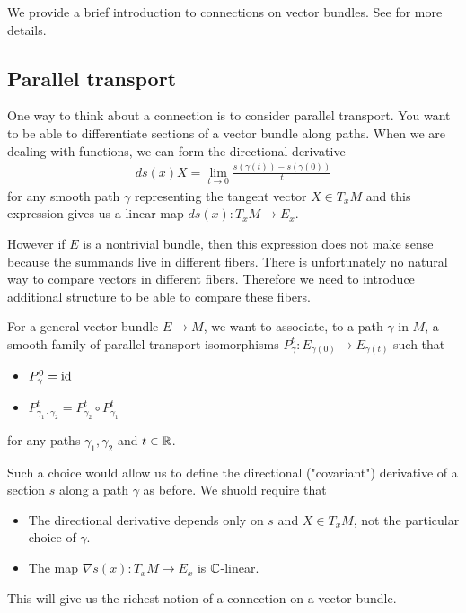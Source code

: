 We provide a brief introduction to connections on vector bundles. See \cite{huybrechts} for more details.
\subsection{Parallel transport}
One way to think about a connection is to consider parallel transport. You want to 
be able to differentiate sections of a vector bundle along paths. When we are dealing with functions,
we can form the directional derivative  \begin{align*}
    ds(x)X = \lim_{t\to 0}\frac{s(\gamma(t)) - s(\gamma(0))}{t}
\end{align*} for any smooth path $\gamma$ representing the tangent vector $X\in T_xM$ 
and this expression gives us a linear map $ds(x):T_xM\to E_x$.

However if $E$ is a nontrivial bundle, then this expression does not make sense because the
 summands live in different fibers. There is unfortunately no natural way to 
 compare vectors in different fibers. Therefore we need to introduce additional structure to 
 be able to compare these fibers.

For a general vector bundle $E\to M$, we want to associate, to a path $\gamma$ in $M$, a smooth family of 
parallel transport isomorphisms $P^t_\gamma: E_{\gamma(0)}\to E_{\gamma(t)}$ such that \begin{itemize}
    \item $P^0_\gamma = \operatorname{id}$
    \item $P^t_{\gamma_1\cdot\gamma_2} = P^t_{\gamma_2}\circ P^t_{\gamma_1}$
\end{itemize} for any paths $\gamma_1,\gamma_2$ and $t\in\mathbb{R}$.


Such a choice would allow us to define the directional ("covariant") derivative of a section $s$ along a path $\gamma$ 
as before. We shuold require that \begin{itemize}
    \item The directional derivative depends only on $s$ and $X\in T_xM$, not the particular 
    choice of $\gamma$.
    \item The map $\nabla s(x):T_xM\to E_x$ is $\mathbb{C}$-linear.
\end{itemize}
This will give us the richest notion of a connection on a vector bundle.
